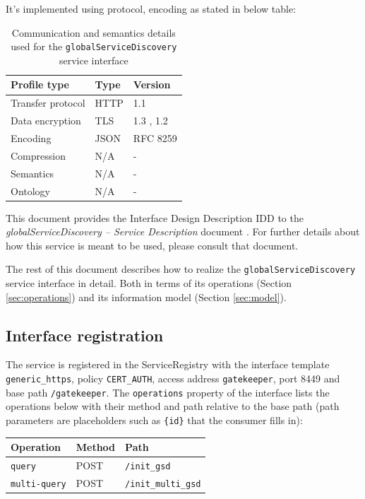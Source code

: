 \documentclass[a4paper]{arrowhead}
\begin{document}
It's implemented using protocol, encoding as stated in below table:
\begin{table}[ht!]
  \centering
  \begin{tabular}{|l|l|l|}
    \hline
    \rowcolor{gray!33} Profile type & Type & Version \\ \hline
    Transfer protocol & HTTP & 1.1 \cite{rfc9112} \\ \hline
    Data encryption & TLS & 1.3 \cite{rfc8446}, 1.2 \cite{rfc5246} \\ \hline
    Encoding & JSON & RFC 8259 \cite{rfc8259} \\ \hline
    Compression & N/A & - \\ \hline
    Semantics & N/A & - \\ \hline
    Ontology & N/A & - \\ \hline
  \end{tabular}
  \caption{Communication and semantics details used for the \texttt{global\allowbreak{}Service\allowbreak{}Discovery} service interface}
  \label{tab:comunication_semantics_profile}
\end{table}

This document provides the Interface Design Description IDD to the \textit{globalServiceDiscovery -- Service Description} document \cite{gk-globalServiceDiscovery-sd}.
For further details about how this service is meant to be used, please consult that document.

The rest of this document describes how to realize the \texttt{global\allowbreak{}Service\allowbreak{}Discovery} service
interface in detail. Both in terms of its operations (Section \ref{sec:operations}) and its information model (Section \ref{sec:model}).

\subsection{Interface registration}

The service is registered in the ServiceRegistry with the interface template \texttt{generic\_\allowbreak{}https}, policy \texttt{CERT\_\allowbreak{}AUTH}, access address \texttt{gatekeeper}, port 8449 and base path \texttt{/\allowbreak{}gatekeeper}. The \texttt{operations} property of the interface lists the operations below with their method and path relative to the base path (path parameters are placeholders such as \texttt{\{id\}} that the consumer fills in):

\noindent\begin{longtable}{| p{5.2cm} | p{1.6cm} | p{8.4cm} |} \hline
\rowcolor{gray!33} Operation & Method & Path \\ \hline \endhead
\texttt{query} & POST & \texttt{/\allowbreak{}init\_\allowbreak{}gsd} \\ \hline
\texttt{multi-\allowbreak{}query} & POST & \texttt{/\allowbreak{}init\_\allowbreak{}multi\_\allowbreak{}gsd} \\ \hline
\end{longtable}
\end{document}
